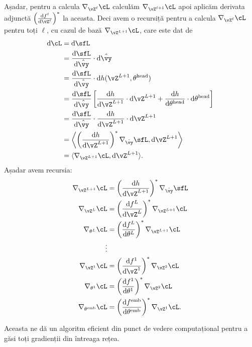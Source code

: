 \documentclass[../../book-main_ro.tex]{subfiles}
\begin{document}
Așadar, pentru a calcula \(\nabla_{\vZ^{\ell}}\cL\) calculăm \(\nabla_{\vZ^{\ell + 1}}\cL\) apoi aplicăm derivata adjunctă \(\bp{\odv{f^{\ell}}{\vZ^{\ell}}}^{*}\) la aceasta. Deci avem o recursiță pentru a calcula \(\nabla_{\vZ^{\ell}}\cL\) pentru toți \(\ell\), cu cazul de bază \(\nabla_{\vZ^{L + 1}}\cL\), care este dat de 
\begin{align}
    \odif{\cL}
    &= \odif{\sfL} \\
    &= \odv{\sfL}{\hat{\vy}}\cdot\odif{\hat{\vy}} \\
    &= \odv{\sfL}{\hat{\vy}}\cdot\odif{{h(\vZ^{L + 1}, \theta^{\head})}} \\ 
    &= \odv{\sfL}{\hat{\vy}}\bs{\odv{h}{\vZ^{L + 1}}\cdot\odif{\vZ}^{L + 1} + \odv{h}{\theta^{\head}}\cdot\odif{\theta}^{\head}} \\ 
    &= \odv{\sfL}{\hat{\vy}}\cdot \odv{h}{\vZ^{L + 1}}\cdot\odif{\vZ}^{L + 1} \\ 
    &= \ip*{\bp{\odv{h}{\vZ^{L + 1}}}^{*}\nabla_{\hat{\vy}}\sfL}{\odif{\vZ}^{L + 1}} \\ 
    &= \ip{\nabla_{\vZ^{L + 1}}\cL}{\odif{\vZ}^{L + 1}}.
\end{align}
Așadar avem recursia:
\begin{align}
    \nabla_{\vZ^{L + 1}}\cL 
    &= \bp{\odv{h}{\vZ^{L + 1}}}^{*}\nabla_{\hat{\vy}}\sfL \\ 
    \nabla_{\vZ^{L}}\cL 
    &= \bp{\odv{f^{L}}{\vZ^{L}}}^{*}\nabla_{\vZ^{L + 1}}\cL \\ 
    \nabla_{\theta^{L}}\cL
    &= \bp{\odv{f^{L}}{\theta^{L}}}^{*}\nabla_{\vZ^{L + 1}}\cL \\
    \vdots &  \\ 
    \nabla_{\vZ^{1}}\cL 
    &= \bp{\odv{f^{1}}{\vZ^{1}}}^{*}\nabla_{\vZ^{2}}\cL \\ 
    \nabla_{\theta^{1}}\cL 
    &= \bp{\odv{f^{1}}{\theta^{1}}}^{*}\nabla_{\vZ^{2}}\cL \\ 
    \nabla_{\theta^{\emb}}\cL 
    &= \bp{\odv{f^{\emb}}{\theta^{\emb}}}^{*}\nabla_{\vZ^{1}}\cL.
\end{align}

Aceasta ne dă un algoritm eficient din punct de vedere computațional pentru a găsi toți gradienții din întreaga rețea.
\end{document}
